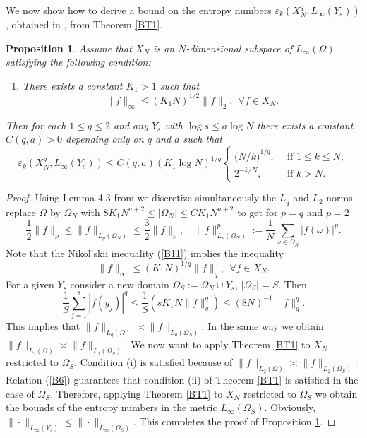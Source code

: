 \documentclass[12pt]{article}
\def \e{\varepsilon}
\newtheorem{Proposition}{Proposition}[section]
\numberwithin{equation}{section}
\newcommand{\be}{\begin{equation}}
\newcommand{\ee}{\end{equation}}
\begin{document}
We now show how to derive a bound on the entropy numbers $\e_k (X_N^q, L_\infty(Y_s))$, obtained in \cite{Kos},  from Theorem \ref{BT1}.

\begin{Proposition}\label{BP2}	Assume that  $X_N$ is  an $N$-dimensional subspace of $L_\infty(\Omega)$ satisfying the following condition:
	\begin{enumerate}
		\item [{\bf \textup{(i)} }] There exists a constant $K_1>1$ such that
		\begin{equation}\label{B11}
		\|f\|_\infty \leq (K_1 N)^{1/2}\|f\|_2,\   \ \forall f\in X_N.
		\end{equation}
	 
	\end{enumerate}
Then for  each $1\leq q\leq 2$ and any $Y_s$ with $\log s \le a \log N$ there exists a constant $C(q,a)>0$ depending only on $q$ and $a$ such that
	\begin{equation}\label{B12}
	\e_k (X_N^q, L_\infty(Y_s)) \leq C(q,a) (K_1\log N)^{1/q} \begin{cases}
	\bigl(N/k\bigr)^{1/q},&\  \ \text{if $1\leq k\leq N$},\\
	2^{-k/N}, &\   \ \text{if $k>N$}.
	\end{cases}
	\end{equation}
 
\end{Proposition}

\begin{proof} Using Lemma 4.3 from \cite{DPSTT2} we discretize simultaneously  the $L_q$ and $L_2$ norms -- replace $\Omega$ by $\Omega_N$ with $8K_1 N^{a+2}\le |\Omega_N| \le CK_1 N^{a+2}$ to get for $p=q$ and $p=2$
$$
\frac{1}{2} \|f\|_p \le \|f\|_{L_p(\Omega_N)} \le \frac{3}{2} \|f\|_p,\quad \|f\|_{L_p(\Omega_N)}^p := \frac{1}{N}\sum_{\omega \in \Omega_N} |f(\omega)|^p.
$$
Note that the Nikol'skii inequality 
(\ref{B11}) implies the inequality
\be\label{B13}
\|f\|_\infty \leq (K_1 N)^{1/q}\|f\|_q,\   \ \forall f\in X_N.
\ee
For a given $Y_s$ consider a new domain $\Omega_S := \Omega_N \cup Y_s$, $|\Omega_S|=S$. Then
$$
\frac{1}{S} \sum_{j=1}^s |f(y_j)|^q \le \frac{1}{S}( s K_1N \|f\|_q^q) \le (8N)^{-1} \|f\|_q^q.
$$
This implies that $\|f\|_{L_q(\Omega)} \asymp \|f\|_{L_q(\Omega_S)}$. In the same way we 
obtain $\|f\|_{L_2(\Omega)} \asymp \|f\|_{L_2(\Omega_S)}$. We now want to apply Theorem \ref{BT1} to $X_N$ restricted to $\Omega_S$. Condition (i) is satisfied because of $\|f\|_{L_2(\Omega)} \asymp \|f\|_{L_2(\Omega_S)}$.
Relation (\ref{B6}) guarantees that condition (ii) of Theorem \ref{BT1} is satisfied in the case of $\Omega_S$. Therefore, applying Theorem \ref{BT1} to $X_N$ restricted to $\Omega_S$ 
we obtain the bounds of the entropy numbers in the metric $L_\infty(\Omega_S)$. Obviously, $\|\cdot\|_{L_\infty(Y_s)} \le \|\cdot\|_{L_\infty(\Omega_S)}$. This completes the proof of Proposition \ref{BP2}. 

\end{proof}
\end{document}
